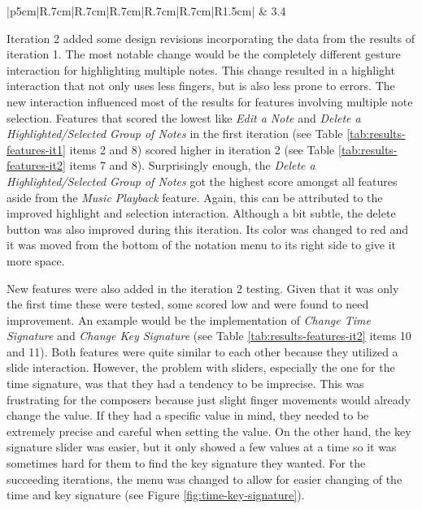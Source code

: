 \begin{longtable}{|p{5cm}|R{.7cm}|R{.7cm}|R{.7cm}|R{.7cm}|R{.7cm}|R{1.5cm}|}
				 & 3.4 \\ \hline
			\end{longtable}

			Iteration 2 added some design revisions incorporating the data from the results of iteration 1. The most notable change would be the completely different gesture interaction for highlighting multiple notes. This change resulted in a highlight interaction that not only uses less fingers, but is also less prone to errors. The new interaction influenced most of the results for features involving multiple note selection. Features that scored the lowest like \textit{Edit a Note} and \textit{Delete a Highlighted/Selected Group of Notes} in the first iteration (see Table \ref{tab:results-features-it1} items 2 and 8) scored higher in iteration 2 (see Table \ref{tab:results-features-it2} items 7 and 8). Surprisingly enough, the \textit{Delete a Highlighted/Selected Group of Notes} got the highest score amongst all features aside from the \textit{Music Playback} feature. Again, this can be attributed to the improved highlight and selection interaction. Although a bit subtle, the delete button was also improved during this iteration. Its color was changed to red and it was moved from the bottom of the notation menu to its right side to give it more space. 

			New features were also added in the iteration 2 testing. Given that it was only the first time these were tested, some scored low and were found to need improvement. An example would be the implementation of \textit{Change Time Signature} and \textit{Change Key Signature} (see Table \ref{tab:results-features-it2} items 10 and 11). Both features were quite similar to each other because they utilized a slide interaction. However, the problem with sliders, especially the one for the time signature, was that they had a tendency to be imprecise. This was frustrating for the composers because just slight finger movements would already change the value. If they had a specific value in mind, they needed to be extremely precise and careful when setting the value. On the other hand, the key signature slider was easier, but it only showed a few values at a time so it was sometimes hard for them to find the key signature they wanted. For the succeeding iterations, the menu was changed to allow for easier changing of the time and key signature (see Figure \ref{fig:time-key-signature}).


